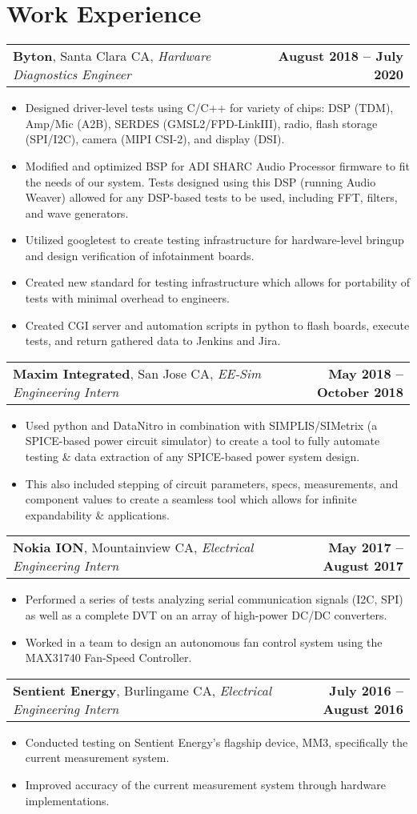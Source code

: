 \documentclass[letterpaper,\fontSize pt]{article}
\makeatletter
\newcommand{\experienceSubheading}[4]{
  \vspace{5pt}
    \begin{tabular*}{\textwidth}[t]{l@{\extracolsep{\fill}}r}
      \textbf{#1}, #2, \textit{#3} & \textbf{#4}
    \end{tabular*}\vspace{-7pt}
}
\newcommand{\resumeItem}[1]{
  \item\small{
    #1 \vspace{-5pt}
  }
}
\newcommand{\resumeItemListStart}{\begin{itemize}}
\newcommand{\resumeItemListEnd}{\end{itemize}\vspace{-5pt}}
\makeatother
\begin{document}
\section{Work Experience}
	\experienceSubheading {Byton}
	{Santa Clara CA}{Hardware Diagnostics Engineer}{August 2018 -- July 2020}
      	\resumeItemListStart
      	        		\resumeItem {Designed driver-level tests using C/C++ for variety of chips: DSP (TDM), Amp/Mic (A2B), SERDES (GMSL2/FPD-LinkIII), radio, flash storage (SPI/I2C), camera (MIPI CSI-2), and display (DSI).}
        		\resumeItem {Modified and optimized BSP for ADI SHARC Audio Processor firmware to fit the needs of our system. Tests designed using this DSP (running Audio Weaver) allowed for any DSP-based tests to be used, including FFT, filters, and wave generators.}
			\resumeItem {Utilized googletest to create testing infrastructure for hardware-level bringup and design verification of infotainment boards.}
        		\resumeItem {Created new standard for testing infrastructure which allows for portability of tests with minimal overhead to engineers.}
        		\resumeItem {Created CGI server and automation scripts in python to flash boards, execute tests, and return gathered data to Jenkins and Jira.}
      	\resumeItemListEnd
	\experienceSubheading {Maxim Integrated}
	{San Jose CA}{EE-Sim Engineering Intern}{May 2018 – October 2018}
		\resumeItemListStart
			\resumeItem {Used python and DataNitro in combination with SIMPLIS/SIMetrix (a SPICE-based power circuit simulator) to create a tool to fully automate testing \& data extraction of any SPICE-based power system design.}
			\resumeItem {This also included stepping of circuit parameters, specs, measurements, and component values to create a seamless tool which allows for infinite expandability \& applications.}
		\resumeItemListEnd
	\experienceSubheading {Nokia ION}
	{Mountainview CA} {Electrical Engineering Intern}{May 2017 – August 2017}
		\resumeItemListStart
			\resumeItem {Performed a series of tests analyzing serial communication signals (I2C, SPI) as well as a complete DVT on an array of high-power DC/DC converters.}
			\resumeItem {Worked in a team to design an autonomous fan control system using the MAX31740 Fan-Speed Controller.}
		\resumeItemListEnd
	\experienceSubheading {Sentient Energy}
	{Burlingame CA}{Electrical Engineering Intern}{July 2016 -- August 2016}
		\resumeItemListStart
			\resumeItem {Conducted testing on Sentient Energy’s flagship device, MM3, specifically the current measurement system.}
			\resumeItem {Improved accuracy of the current measurement system through hardware implementations.}
		\resumeItemListEnd
\end{document}
